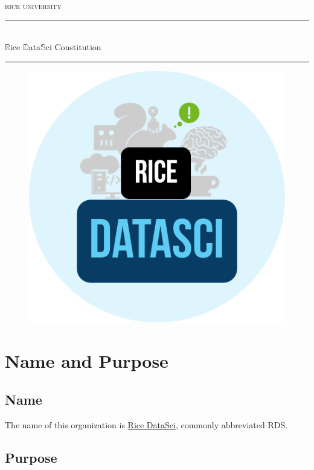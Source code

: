 \documentclass[12pt]{article}
\newcommand{\horrule}[1]{\rule{\linewidth}{#1}}
\begin{document}
 

\begin{titlepage}
  \centering
  \vspace*{\fill}
  \normalfont \normalsize 
  \textsc{rice university} \\
  \horrule{0.5pt} \\[0.5cm] %
  \huge $\mathbb{R}$ice $\mathbb{D}$ata$\mathbb{S}$ci Constitution \\
  \horrule{2pt} %
  \vspace{1cm}
  \begin{figure}[htpb]
    \centering
    \includegraphics[width=0.5\linewidth]{./rds_badge.png}
  \end{figure}
  \vspace*{\fill}
\end{titlepage}

\newpage
\section{Name and Purpose}

\subsection{Name}
The name of this organization is \underline{Rice DataSci}, commonly abbreviated
RDS.

\subsection{Purpose}
\end{document}
